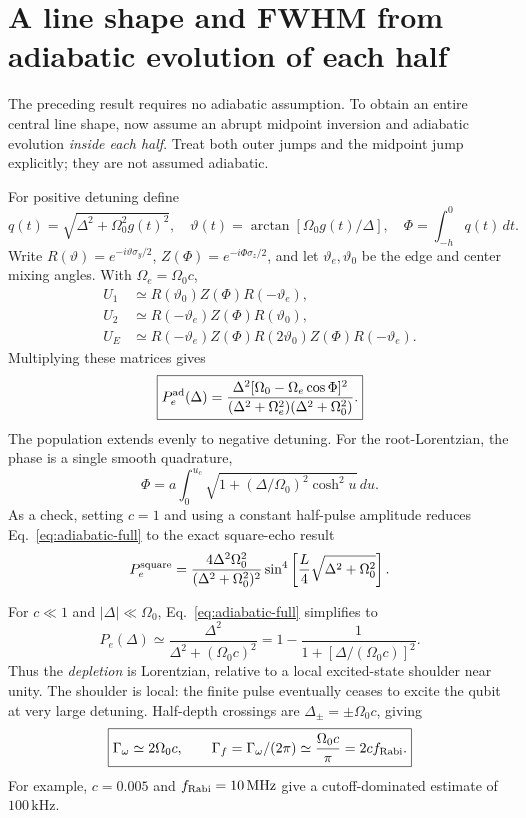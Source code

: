 \documentclass[11pt]{article}
\newcommand{\Pe}{P_e}
\newcommand{\Om}{\Omega}
\begin{document}
\section{A line shape and FWHM from adiabatic evolution of each half}
The preceding result requires no adiabatic assumption. To obtain an entire
central line shape, now assume an abrupt midpoint inversion and adiabatic
evolution \emph{inside each half}. Treat both outer jumps and the midpoint
jump explicitly; they are not assumed adiabatic.

For positive detuning define
\begin{equation}
 q(t)=\sqrt{\Delta^2+\Om_0^2g(t)^2},\quad
 \vartheta(t)=\arctan[\Om_0g(t)/\Delta],\quad
 \Phi=\int_{-h}^0q(t)\,dt.
\end{equation}
Write $R(\vartheta)=e^{-i\vartheta\sigma_y/2}$,
$Z(\Phi)=e^{-i\Phi\sigma_z/2}$, and let $\vartheta_e,\vartheta_0$
be the edge and center mixing angles. With $\Om_e=\Om_0c$,
\begin{align}
 U_1&\simeq R(\vartheta_0)Z(\Phi)R(-\vartheta_e),\\
 U_2&\simeq R(-\vartheta_e)Z(\Phi)R(\vartheta_0),\\
 U_E&\simeq R(-\vartheta_e)Z(\Phi)R(2\vartheta_0)
                       Z(\Phi)R(-\vartheta_e).
\end{align}
Multiplying these matrices gives
\begin{equation}
 \boxed{\Pe^{\rm ad}(\Delta)=
 \frac{\Delta^2[\Om_0-\Om_e\cos\Phi]^2}
 {(\Delta^2+\Om_e^2)(\Delta^2+\Om_0^2)}.}
 \label{eq:adiabatic-full}
\end{equation}
The population extends evenly to negative detuning. For the root-Lorentzian,
the phase is a single smooth quadrature,
\begin{equation}
 \Phi=a\int_0^{u_c}
 \sqrt{1+(\Delta/\Om_0)^2\cosh^2u}\,du.
\end{equation}
As a check, setting $c=1$ and using a constant half-pulse amplitude reduces
Eq.~\eqref{eq:adiabatic-full} to the exact square-echo result
\begin{equation}
 \Pe^{\rm square}=
 \frac{4\Delta^2\Om_0^2}{(\Delta^2+\Om_0^2)^2}
 \sin^4\left[\frac{L}{4}\sqrt{\Delta^2+\Om_0^2}\right].
\end{equation}

For $c\ll1$ and $|\Delta|\ll\Om_0$, Eq.~\eqref{eq:adiabatic-full}
simplifies to
\begin{equation}
 \boxed{\Pe(\Delta)\simeq\frac{\Delta^2}{\Delta^2+(\Om_0c)^2}
 =1-\frac{1}{1+[\Delta/(\Om_0c)]^2}.}
 \label{eq:lorentzian}
\end{equation}
Thus the \emph{depletion} is Lorentzian, relative to a local excited-state
shoulder near unity. The shoulder is local: the finite pulse eventually
ceases to excite the qubit at very large detuning. Half-depth crossings are
$\Delta_\pm=\pm\Om_0c$, giving
\begin{equation}
 \boxed{\Gamma_\omega\simeq2\Om_0c,\qquad
 \Gamma_f=\Gamma_\omega/(2\pi)\simeq\frac{\Om_0c}{\pi}
 =2c f_{\rm Rabi}.}
 \label{eq:width}
\end{equation}
For example, $c=0.005$ and $f_{\rm Rabi}=10\,\mathrm{MHz}$ give a
cutoff-dominated estimate of $100\,\mathrm{kHz}$.
\end{document}

